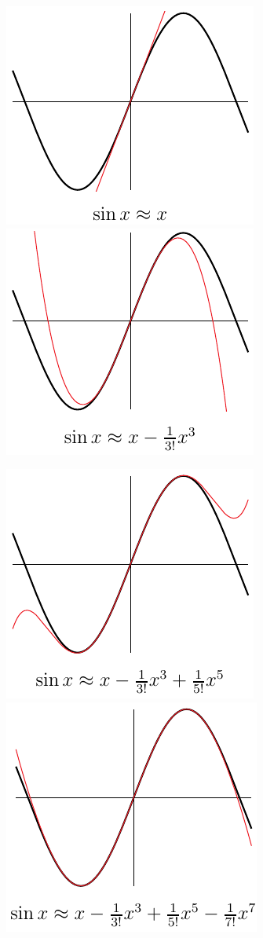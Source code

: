 \begin{eg}
\begin{efig}
\begin{center}
  \includegraphics{approx1c} \qquad\qquad
  \includegraphics{approx2c}
\end{center}
\begin{center}
  \includegraphics{approx3c} \qquad\qquad
  \includegraphics{approx4c}
\end{center}
\end{efig}


\end{eg}
